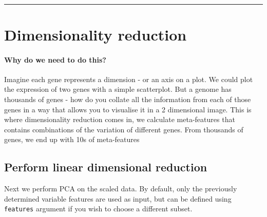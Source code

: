 \documentclass[
]{book}
\begin{document}
~

\begin{center}\rule{0.5\linewidth}{0.5pt}\end{center}

\hypertarget{dimensionality-reduction}{%
\chapter{Dimensionality reduction}\label{dimensionality-reduction}}

\hypertarget{why-do-we-need-to-do-this-4}{%
\subsubsection*{Why do we need to do this?}\label{why-do-we-need-to-do-this-4}}

Imagine each gene represents a dimension - or an axis on a plot. We could plot the expression of two genes with a simple scatterplot. But a genome has thousands of genes - how do you collate all the information from each of those genes in a way that allows you to visualise it in a 2 dimensional image. This is where dimensionality reduction comes in, we calculate meta-features that contains combinations of the variation of different genes. From thousands of genes, we end up with 10s of meta-features

\hypertarget{section-6}{%
\subsubsection*{}\label{section-6}}

\hypertarget{perform-linear-dimensional-reduction}{%
\section{Perform linear dimensional reduction}\label{perform-linear-dimensional-reduction}}

Next we perform PCA on the scaled data. By default, only the previously determined variable features are used as input, but can be defined using \texttt{features} argument if you wish to choose a different subset.
\end{document}
